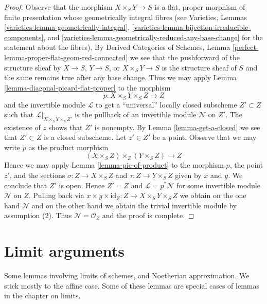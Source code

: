 \begin{proof}
Observe that the morphism $X \times_S Y \to S$ is a flat, proper morphism
of finite presentation whose geometrically integral fibres
(see Varieties, Lemmas \ref{varieties-lemma-geometrically-integral},
\ref{varieties-lemma-bijection-irreducible-components},
and \ref{varieties-lemma-geometrically-reduced-any-base-change} for the
statement about the fibres). By Derived Categories of Schemes, Lemma
\ref{perfect-lemma-proper-flat-geom-red-connected}
we see that the pushforward of the structure sheaf by $X \to S$, $Y \to S$, or
$X \times_S Y \to S$ is the structure sheaf of $S$ and the same remains true
after any base change. Thus we may apply
Lemma \ref{lemma-diagonal-picard-flat-proper} to the morphism
$$
p : X \times_S Y \times_S Z \longrightarrow Z
$$
and the invertible module $\mathcal{L}$ to get a ``universal'' locally closed
subscheme $Z' \subset Z$ such that $\mathcal{L}|_{X \times_S Y \times_S Z'}$
is the pullback of an invertible module $\mathcal{N}$ on $Z'$.
The existence of $z$ shows that $Z'$ is nonempty. By
Lemma \ref{lemma-get-a-closed}
we see that $Z' \subset Z$ is a closed subscheme.
Let $z' \in Z'$ be a point.
Observe that we may write $p$ as the product morphism
$$
(X \times_S Z) \times_Z (Y \times_S Z) \longrightarrow Z
$$
Hence we may apply Lemma \ref{lemma-pic-of-product}
to the morphism $p$, the point $z'$, and the sections
$\sigma : Z \to X \times_S Z$ and $\tau : Z \to Y \times_S Z$
given by $x$ and $y$. We conclude that $Z'$ is open.
Hence $Z' = Z$ and $\mathcal{L} = p^*\mathcal{N}$
for some invertible module $\mathcal{N}$ on $Z$.
Pulling back via
$x \times y \times \text{id}_Z : Z  \to X \times_S Y \times_S Z$
we obtain on the one hand $\mathcal{N}$ and on the other hand
we obtain the trivial invertible module by assumption (2).
Thus $\mathcal{N} = \mathcal{O}_Z$ and the proof is complete.
\end{proof}









\section{Limit arguments}
\label{section-limits}

\noindent
Some lemmas involving limits of schemes, and Noetherian approximation.
We stick mostly to the affine case. Some of these lemmas are special
cases of lemmas in the chapter on limits.

